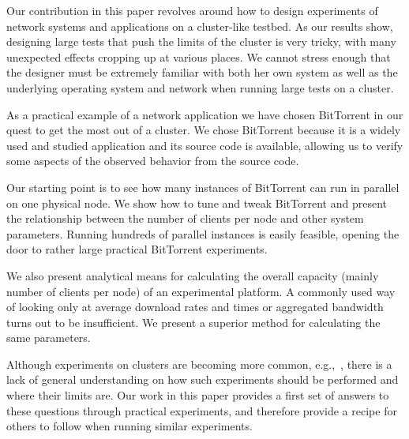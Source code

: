 \documentclass[10pt,letterpaper,twocolumn]{article}
\begin{document}
Our contribution in this paper revolves around how to design
experiments of network systems and applications on a cluster-like
testbed. As our results show, designing large tests that push the
limits of the cluster is very tricky, with many unexpected effects
cropping up at various places. We cannot stress enough that the
designer must be extremely familiar with both her own system as well
as the underlying operating system and network when running large
tests on a cluster.

As a practical example of a network application we have chosen
BitTorrent in our quest to get the most out of a cluster. We chose
BitTorrent because it is a widely used and studied application and its
source code is available, allowing us to verify some aspects of the
observed behavior from the source code. 



Our starting point is to see how many instances of BitTorrent can run
in parallel on one physical node. We show how to tune and tweak
BitTorrent and present the relationship between the number of clients
per node and other system parameters. Running hundreds of parallel
instances is easily feasible, opening the door to rather large
practical BitTorrent experiments.

We also present analytical means for calculating the overall capacity
(mainly number of clients per node) of an experimental platform. A
commonly used way of looking only at average download rates and times
or aggregated bandwidth turns out to be insufficient. We present a
superior method for calculating the same parameters.

Although experiments on clusters are becoming more common,
e.g.,~\cite{rao10}, there is a lack of general understanding on how
such experiments should be performed and where their limits are. Our
work in this paper provides a first set of answers to these questions
through practical experiments, and therefore provide a recipe for
others to follow when running similar experiments.
\end{document}
